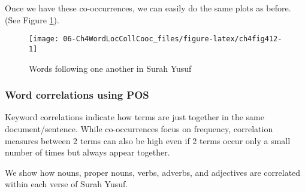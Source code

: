 \documentclass[
]{article}
\newenvironment{Shaded}{\begin{snugshade}}{\end{snugshade}}
\newcommand{\AttributeTok}[1]{\textcolor[rgb]{0.13,0.29,0.53}{#1}}
\newcommand{\DecValTok}[1]{\textcolor[rgb]{0.00,0.00,0.81}{#1}}
\newcommand{\FunctionTok}[1]{\textcolor[rgb]{0.13,0.29,0.53}{\textbf{#1}}}
\newcommand{\NormalTok}[1]{#1}
\newcommand{\OtherTok}[1]{\textcolor[rgb]{0.56,0.35,0.01}{#1}}
\newcommand{\SpecialCharTok}[1]{\textcolor[rgb]{0.81,0.36,0.00}{\textbf{#1}}}
\newcommand{\StringTok}[1]{\textcolor[rgb]{0.31,0.60,0.02}{#1}}
\begin{document}
\footnotesize

\begin{Shaded}
\end{Shaded}

\normalsize

Once we have these co-occurrences, we can easily do the same plots as before. (See Figure \ref{fig:ch4fig412}).

\begin{figure}

{\centering \texttt{[image: 06-Ch4WordLocCollCooc\_files/figure-latex/ch4fig412-1]} 

}

\caption{Words following one another in Surah Yusuf}\label{fig:ch4fig412}
\end{figure}

\hypertarget{word-correlations-using-pos}{%
\subsubsection{Word correlations using POS}\label{word-correlations-using-pos}}

Keyword correlations indicate how terms are just together in the same document/sentence. While co-occurrences focus on frequency, correlation measures between 2 terms can also be high even if 2 terms occur only a small number of times but always appear together.

We show how nouns, proper nouns, verbs, adverbs, and adjectives are correlated within each verse of Surah Yusuf.

\footnotesize
\end{document}
